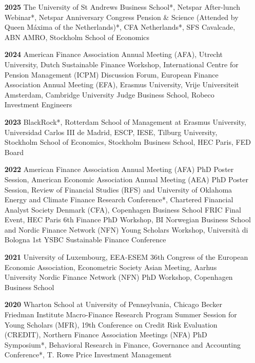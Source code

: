 \documentclass[11pt]{res} %
\begin{document}
\begin{resume}
\begin{itemize}
\item[\textbf{2025}] The University of St Andrews Business School*, Netspar After-lunch Webinar*, Netspar Anniversary Congress Pension \& Science (Attended by Queen Máxima of the Netherlands)*, CFA Netherlands*, SFS Cavalcade, ABN AMRO, Stockholm School of Economics\\[-1ex] 

\item[\textbf{2024}] American Finance Association Annual Meeting (AFA), Utrecht University, Dutch Sustainable Finance Workshop, International Centre for Pension Management (ICPM)  Discussion Forum, European Finance Association Annual Meeting (EFA), Erasmus University, Vrije Universiteit Amsterdam, Cambridge University Judge Business School, Robeco Investment Engineers\\[-1ex] %

\item[\textbf{2023}] BlackRock*, Rotterdam School of Management at Erasmus University, Universidad Carlos III de Madrid, ESCP, IESE, Tilburg University, Stockholm School of Economics, Stockholm Business School, HEC Paris, FED Board\\[-1ex]

\item[\textbf{2022}]  American Finance Association Annual Meeting (AFA) PhD Poster Session, American Economic Association Annual Meeting (AEA) PhD Poster Session, Review of Financial Studies (RFS) and University of Oklahoma Energy and Climate Finance Research Conference*, Chartered Financial Analyst Society Denmark (CFA), Copenhagen Business School FRIC Final Event, HEC Paris 6th Finance PhD Workshop,  BI Norwegian Business School and Nordic Finance Network (NFN) Young Scholars Workshop, Università di Bologna 1st YSBC Sustainable Finance Conference\\[-1ex]

\item[\textbf{2021}]  University of Luxembourg, EEA-ESEM 36th Congress of the European Economic Association, Econometric Society Asian Meeting,  Aarhus University Nordic Finance Network (NFN) PhD Workshop, Copenhagen Business School\\[-1ex]

\item[\textbf{2020}]  Wharton School at University of Pennsylvania, Chicago Becker Friedman Institute Macro-Finance Research Program Summer Session for Young Scholars (MFR), 19th Conference on Credit Risk Evaluation (CREDIT), Northern Finance Association Meetings (NFA) PhD Symposium*, Behavioral Research in Finance, Governance and Accounting Conference*, T. Rowe Price Investment Management\\[-1ex]


\end{itemize}
\end{resume}
\end{document}
